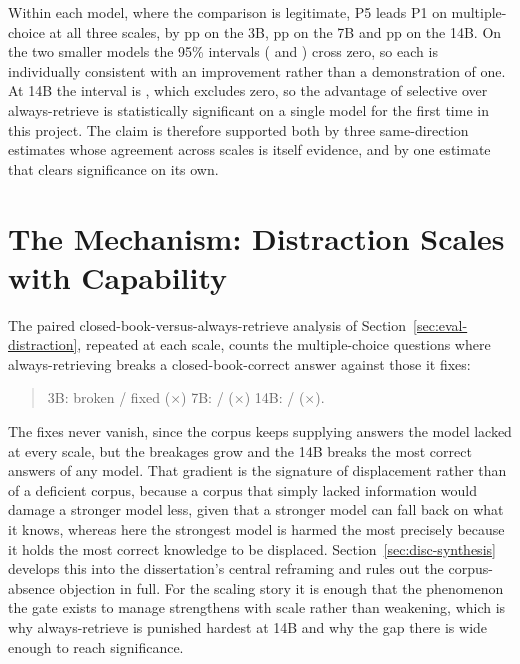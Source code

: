 Within each model, where the comparison is legitimate, P5 leads P1 on
multiple-choice at all three scales, by \diffPfivePone{}pp on the 3B,
\diffQwenPfivePone{}pp on the 7B and \diffFourteenPfivePone{}pp on the 14B.
On the two smaller models the 95\% intervals (\diffPfivePoneCI{} and
\diffQwenPfivePoneCI{}) cross zero, so each is individually consistent with an
improvement rather than a demonstration of one. At 14B the interval is
\diffFourteenPfivePoneCI{}, which excludes zero, so the advantage of selective
over always-retrieve is statistically significant on a single model for the
first time in this project. The claim is therefore supported both by three
same-direction estimates whose agreement across scales is itself evidence, and
by one estimate that clears significance on its own.

\section{The Mechanism: Distraction Scales with Capability}
\label{sec:scaling-mechanism}

The paired closed-book-versus-always-retrieve analysis of
Section~\ref{sec:eval-distraction}, repeated at each scale, counts the
multiple-choice questions where always-retrieving breaks a closed-book-correct
answer against those it fixes:

\begin{quote}
  3B: \breakLlama{} broken / \fixLlama{} fixed (\harmRatioLlama{}$\times$)
  \quad 7B: \breakQwenSeven{} / \fixQwenSeven{}
  (\harmRatioQwenSeven{}$\times$) \quad
  14B: \breakQwenFourteen{} / \fixQwenFourteen{}
  (\harmRatioQwenFourteen{}$\times$).
\end{quote}

The fixes never vanish, since the corpus keeps supplying answers the model
lacked at every scale, but the breakages grow and the 14B breaks the most
correct answers of any model. That gradient is the signature of displacement
rather than of a deficient corpus, because a corpus that simply lacked
information would damage a stronger model less, given that a stronger model
can fall back on what it knows, whereas here the strongest model is harmed the
most precisely because it holds the most correct knowledge to be displaced.
Section~\ref{sec:disc-synthesis} develops this into the dissertation's central
reframing and rules out the corpus-absence objection in full. For the scaling
story it is enough that the phenomenon the gate exists to manage strengthens
with scale rather than weakening, which is why always-retrieve is punished
hardest at 14B and why the gap there is wide enough to reach significance.

